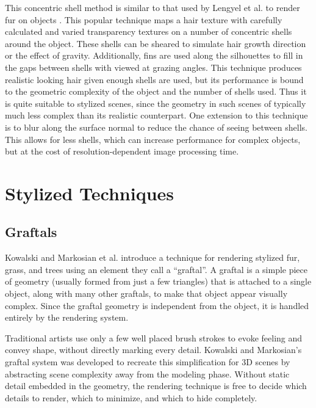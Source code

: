 \documentclass[notitlepage]{report}
\begin{document}
    This concentric shell method is similar to that used by Lengyel et al. to render fur on objects \cite{Lengyel2001}. This popular technique maps a hair texture with carefully calculated and varied transparency textures on a number of concentric shells around the object. These shells can be sheared to simulate hair growth direction or the effect of gravity. Additionally, fins are used along the silhouettes to fill in the gaps between shells with viewed at grazing angles. This technique produces realistic looking hair given enough shells are used, but its performance is bound to the geometric complexity of the object and the number of shells used. Thus it is quite suitable to stylized scenes, since the geometry in such scenes of typically much less complex than its realistic counterpart. One extension to this technique is to blur along the surface normal to reduce the chance of seeing between shells. This allows for less shells, which can increase performance for complex objects, but at the cost of resolution-dependent image processing time.

\section{Stylized Techniques}
\subsection{Graftals}
Kowalski and Markosian et al. introduce a technique for rendering stylized fur, grass, and trees using an element they call a “graftal”\cite{Kowalski1999}. A graftal is a simple piece of geometry (usually formed from just a few triangles) that is attached to a single object, along with many other graftals, to make that object appear visually complex. Since the graftal geometry is independent from the object, it is handled entirely by the rendering system. 

Traditional artists use only a few well placed brush strokes to evoke feeling and convey shape, without directly marking every detail. Kowalski and Markosian's graftal system was developed to recreate this simplification for 3D scenes by abstracting scene complexity away from the modeling phase. Without static detail embedded in the geometry, the rendering technique is free to decide which details to render, which to minimize, and which to hide completely.
\end{document}
